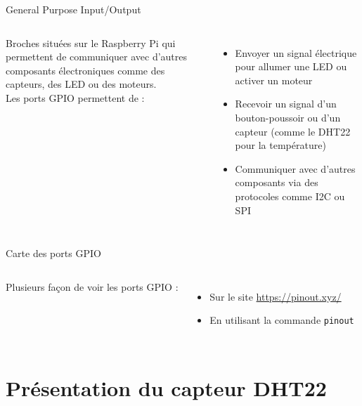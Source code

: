 \documentclass[aspectratio=169,xcolor=dvipsnames]{beamer}
\begin{document}
\begin{frame}{General Purpose Input/Output}
    \begin{columns}[c] %

        Broches situées sur le Raspberry Pi qui permettent de communiquer avec d'autres composants électroniques comme des capteurs, des LED ou des moteurs.\\
        \vspace{5mm}
        Les ports GPIO permettent de :
        \begin{itemize}
            \item Envoyer un signal électrique pour allumer une LED ou activer un moteur
            \item Recevoir un signal d'un bouton-poussoir ou d'un capteur (comme le DHT22 pour la température)
            \item Communiquer avec d'autres composants via des protocoles comme I2C ou SPI
        \end{itemize}
    \end{columns}
\end{frame}

\begin{frame}{Carte des ports GPIO}
    \begin{columns}[c] %

        Plusieurs façon de voir les ports GPIO :
        \vspace{5mm}
        \begin{itemize}
            \item Sur le site \url{https://pinout.xyz/}
            \item En utilisant la commande \texttt{pinout}
        \end{itemize}
    \end{columns}
\end{frame}


\section{Présentation du capteur DHT22}
\end{document}
